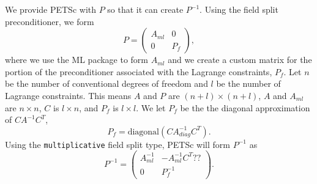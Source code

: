 \documentclass{article}[10pt]
\begin{document}
We provide PETSc with $P$ so that it can create $P^{-1}$. Using the
field split preconditioner, we form
\begin{equation}
  P = \left( \begin{array}{cc}
    A_\mathit{ml} & 0 \\
    0 & P_f
  \end{array} \right),
\end{equation}
where we use the ML package to form $A_\mathit{ml}$ and we create a
custom matrix for the portion of the preconditioner associated with
the Lagrange constraints, $P_f$. Let $n$ be the number of conventional
degrees of freedom and $l$ be the number of Lagrange constraints. This
means $A$ and $P$ are $(n+l) \times (n+l)$, $A$ and $A_\mathit{ml}$
are $n \times n$, $C$ is $l \times n$, and $P_f$ is $l \times l$.
We let $P_f$ be the the diagonal approximation of $C A^{-1} C^T$,
\begin{equation}
  P_f = \text{diagonal}(C A_\mathit{diag}^{-1} C^T).
\end{equation}
Using the {\tt multiplicative} field split type, PETSc will form
$P^{-1}$ as
\begin{equation}
  P^{-1} = \left( \begin{array}{cc}
    A_\mathit{ml}^{-1} & -A_\mathit{ml}^{-1} C^T ?? \\
    0 & P_f^{-1}
  \end{array} \right).
\end{equation}



\end{document}
